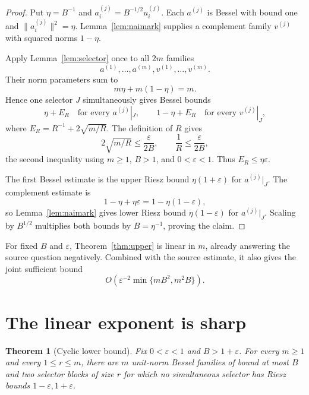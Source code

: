 \documentclass[11pt]{article}
\newtheorem{theorem}{Theorem}
\begin{document}
\begin{proof}
Put \(\eta=B^{-1}\) and
\(a_i^{(j)}=B^{-1/2}u_i^{(j)}\). Each \(a^{(j)}\) is Bessel with bound one
and \(\|a_i^{(j)}\|^2=\eta\). Lemma~\ref{lem:naimark} supplies a complement
family \(v^{(j)}\) with squared norms \(1-\eta\).

Apply Lemma~\ref{lem:selector} once to all \(2m\) families
\[
 a^{(1)},\ldots,a^{(m)},v^{(1)},\ldots,v^{(m)}.
\]
Their norm parameters sum to
\[
 m\eta+m(1-\eta)=m.
\]
Hence one selector \(J\) simultaneously gives Bessel bounds
\[
 \eta+E_R\quad\text{for every }a^{(j)}|_J,
 \qquad
 1-\eta+E_R\quad\text{for every }v^{(j)}|_J,
\]
where \(E_R=R^{-1}+2\sqrt{m/R}\). The definition of \(R\) gives
\[
 2\sqrt{m/R}\le\frac{\varepsilon}{2B},
 \qquad
 \frac1R\le\frac{\varepsilon}{2B},
\]
the second inequality using \(m\ge1\), \(B>1\), and
\(0<\varepsilon<1\). Thus \(E_R\le\eta\varepsilon\).

The first Bessel estimate is the upper Riesz bound
\(\eta(1+\varepsilon)\) for \(a^{(j)}|_J\). The complement estimate is
\[
 1-\eta+\eta\varepsilon=1-\eta(1-\varepsilon),
\]
so Lemma~\ref{lem:naimark} gives lower Riesz bound
\(\eta(1-\varepsilon)\) for \(a^{(j)}|_J\). Scaling by \(B^{1/2}\)
multiplies both bounds by \(B=\eta^{-1}\), proving the claim.
\end{proof}

For fixed \(B\) and \(\varepsilon\), Theorem~\ref{thm:upper} is linear in
\(m\), already answering the source question negatively. Combined with the
source estimate, it also gives the joint sufficient bound
\[
 O\!\left(\varepsilon^{-2}\min\{mB^2,m^2B\}\right).
\]

\section{The linear exponent is sharp}

\begin{theorem}[Cyclic lower bound]\label{thm:lower}
Fix \(0<\varepsilon<1\) and \(B>1+\varepsilon\). For every \(m\ge1\) and
every \(1\le r\le m\), there are \(m\) unit-norm Bessel families of bound at
most \(B\) and two selector blocks of size \(r\) for which no simultaneous
selector has Riesz bounds \(1-\varepsilon,1+\varepsilon\).
\end{theorem}
\end{document}

